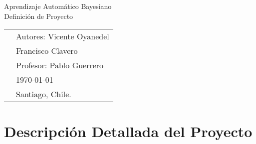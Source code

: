 \documentclass[letterpaper,11pt, spanish]{article}
\begin{document}
\onehalfspace{}


\newpage
\pagestyle{fancy}
\fancyhf{}
\vspace*{6cm}
\begin{center}
\Huge  {Aprendizaje Automático Bayesiano}\\
\vspace{1cm}
\huge {Definición de Proyecto} \\
\end{center}
\vfill
\begin{flushright}
\begin{tabular}{ll}
& Autores: Vicente Oyanedel \\
& 			Francisco Clavero \\
& Profesor: Pablo Guerrero \\
& \today \\
& Santiago, Chile.
\end{tabular}
\end{flushright}

\newpage
\pagestyle{fancy}
\fancyhf{}



\fancyfoot[R]{\small \rm \textit{\thepage}} %

\renewcommand{\sectionmark}[1]{\markright{\thesection.\ #1}}
\renewcommand{\headrulewidth}{0.5pt}
\renewcommand{\footrulewidth}{0.5pt}


\tableofcontents

\newpage
\section{Descripción Detallada del Proyecto}
\end{document}
